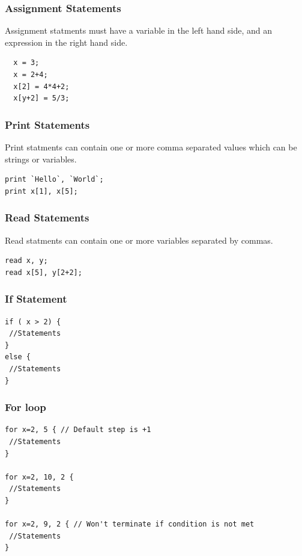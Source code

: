 \documentclass[12pt]{report}
\begin{document}
\subsubsection*{Assignment Statements}
Assignment statments must have a variable in the left hand side, and an expression in the right hand side.
\begin{lstlisting}
  x = 3;
  x = 2+4;
  x[2] = 4*4+2;
  x[y+2] = 5/3;
\end{lstlisting}

\subsubsection*{Print Statements}
Print statments can contain one or more comma separated values which can be strings or variables.
\begin{lstlisting}
print `Hello`, `World`;
print x[1], x[5];
\end{lstlisting}

\subsubsection*{Read Statements}
Read statments can contain one or more variables separated by commas.
\begin{lstlisting}
read x, y;
read x[5], y[2+2];
\end{lstlisting}

\subsubsection*{If Statement}
\begin{lstlisting}
if ( x > 2) {
 //Statements
}
else {
 //Statements  
}
\end{lstlisting}

\subsubsection*{For loop}
\begin{lstlisting}
for x=2, 5 { // Default step is +1
 //Statements
}

for x=2, 10, 2 {
 //Statements
}

for x=2, 9, 2 { // Won't terminate if condition is not met
 //Statements
}

\end{lstlisting}
\end{document}
